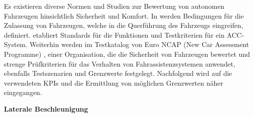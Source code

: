 Es existieren diverse Normen und Studien zur Bewertung von autonomen Fahrzeugen hinsichtlich Sicherheit und Komfort. In \cite{UNECE_R79} werden Bedingungen für die Zulassung von Fahrzeugen, welche in die Querführung des Fahrzeugs eingreifen, definiert. \cite{ISO15622} etabliert Standards für die Funktionen und Testkriterien für ein ACC-System. Weiterhin werden im Testkatalog von Euro NCAP (New Car Assessment Programme) \cite{NCAP2024}, einer Organisation, die die Sicherheit von Fahrzeugen bewertet und strenge Prüfkriterien für das Verhalten von Fahrassistenzsystemen anwendet, ebenfalls Testszenarien und Grenzwerte festgelegt. Nachfolgend wird auf die verwendeten KPIs und die Ermittlung von möglichen Grenzwerten näher eingegangen.

\bigskip\noindent\textbf{Laterale Beschleunigung}

